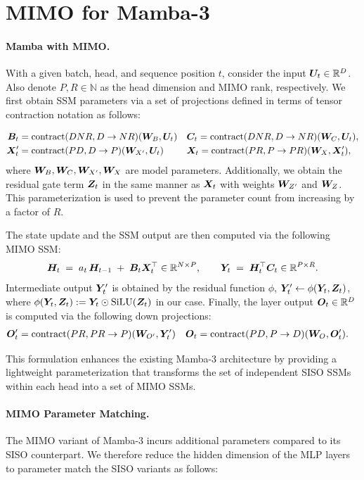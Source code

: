 \section{MIMO for Mamba-3}
\label{app:mimo-for-mamba}

\paragraph{Mamba with MIMO.}
With a given batch, head, and sequence position $t$, consider the input ${\bm{U}}_t \in \mathbb{R}^{D}$. Also denote $P, R\in\mathbb{N}$ as the head dimension and MIMO rank, respectively. We first obtain SSM parameters via a set of projections defined in terms of tensor contraction notation as follows:

\begin{align*}
    {\bm{B}}_t &= \text{contract}(DNR,D\rightarrow NR)({\bm{W}}_B,{\bm{U}}_t)
    && {\bm{C}}_t = \text{contract}(DNR,D\rightarrow NR)({\bm{W}}_C,{\bm{U}}_t),\\
    {\bm{X}}'_t &= \text{contract}(PD,D\rightarrow P)({\bm{W}}_{X'},{\bm{U}}_t)
    && {\bm{X}}_t = \text{contract}(PR,P\rightarrow PR)({\bm{W}}_X,{\bm{X}}'_t),\\
\end{align*}
where ${\bm{W}}_B, {\bm{W}}_C, {\bm{W}}_{X'}, {\bm{W}}_X$ are model parameters. Additionally, we obtain the residual gate term ${\bm{Z}}_t$ in the same manner as ${\bm{X}}_t$ with weights ${\bm{W}}_{Z'}$ and ${\bm{W}}_Z$.
This parameterization is used to prevent the parameter count from increasing by a factor of $R$.

The state update and the SSM output are then computed via the following MIMO SSM:
\[
{\bm{H}}_t \;=\; a_t\,{\bm{H}}_{t-1} \;+\; {\bm{B}}_t {\bm{X}}_t^\top \in \mathbb{R}^{N\times P},
\qquad
{\bm{Y}}_t \;=\; {\bm{H}}_t ^\top {\bm{C}}_{t} \in \mathbb{R}^{P\times R} .
\]
Intermediate output ${\bm{Y}}'_t$ is obtained by the residual function $\phi$, ${\bm{Y}}'_t \gets \phi({\bm{Y}}_t, {\bm{Z}}_t)$, where $\phi({\bm{Y}}_t, {\bm{Z}}_t):={\bm{Y}}_t \odot \text{SiLU}({\bm{Z}}_t)$ in our case. 
Finally, the layer output ${\bm{O}}_t \in \mathbb{R}^D$ is computed via the following down projections:
\begin{align*}
    {\bm{O}}'_t &= \text{contract}(PR,PR\rightarrow P)({\bm{W}}_{O'},{\bm{Y}}'_t)
    && {\bm{O}}_t = \text{contract}(PD,P\rightarrow D)({\bm{W}}_{O},{\bm{O}}'_t).
\end{align*}

This formulation enhances the existing Mamba-3 architecture by providing a lightweight parameterization that transforms the set of independent SISO SSMs within each head into a set of MIMO SSMs.

\paragraph{MIMO Parameter Matching.}
The MIMO variant of Mamba-3 incurs additional parameters compared to its SISO counterpart. We therefore reduce the hidden dimension of the MLP layers to parameter match the SISO variants as follows:

